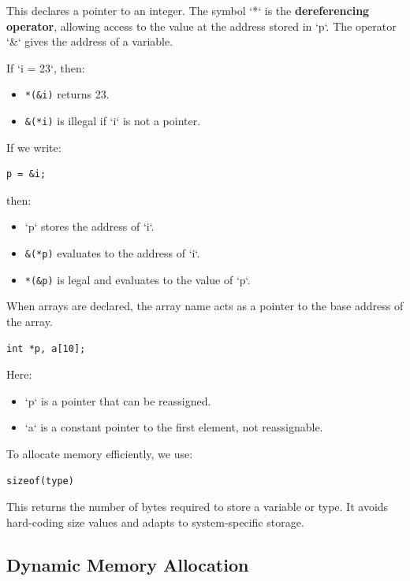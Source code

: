 \documentclass[a4paper, 10pt]{article}
\begin{document}
This declares a pointer to an integer. The symbol `*` is the \textbf{dereferencing operator}, allowing access to the value at the address stored in `p`. The operator `\&` gives the address of a variable.

If `i = 23`, then:
\begin{itemize}
    \item \texttt{*(\&i)} returns 23.
    \item \texttt{\&(*i)} is illegal if `i` is not a pointer.
\end{itemize}

If we write:

\begin{verbatim}
p = &i;
\end{verbatim}

then:
\begin{itemize}
    \item `p` stores the address of `i`.
    \item \texttt{\&(*p)} evaluates to the address of `i`.
    \item \texttt{*(\&p)} is legal and evaluates to the value of `p`.
\end{itemize}

When arrays are declared, the array name acts as a pointer to the base address of the array.

\begin{verbatim}
int *p, a[10];
\end{verbatim}

Here:
\begin{itemize}
    \item `p` is a pointer that can be reassigned.
    \item `a` is a constant pointer to the first element, not reassignable.
\end{itemize}

To allocate memory efficiently, we use:

\begin{verbatim}
sizeof(type)
\end{verbatim}

This returns the number of bytes required to store a variable or type. It avoids hard-coding size values and adapts to system-specific storage.

\subsection{Dynamic Memory Allocation}
\end{document}
